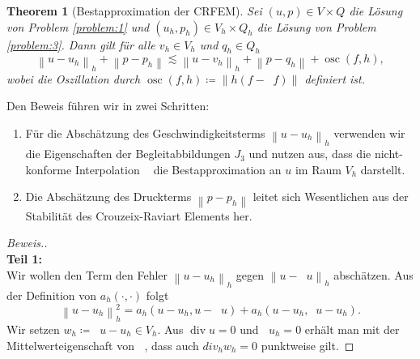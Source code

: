 \message{ !name(script.tex)}\documentclass[a4paper]{scrartcl}
\newcommand{\J}[1]{J_{#1}}
\newcommand{\norm}[1]{\left\lVert#1\right\rVert}
\newcommand{\hnorm}[1]{\left\lVert#1\right\rVert_h}
\DeclareMathOperator{\divOp}{div}
\DeclareMathOperator{\divh}{div_h}
\DeclareMathOperator{\intOp}{I_{NC}}
\DeclareMathOperator{\LtwoOp}{\Pi_0}
\DeclareMathOperator{\osc}{osc}
\theoremstyle{plain}
\newtheorem{theorem}{Theorem}
\theoremstyle{definition}
\theoremstyle{remark}
\begin{document}
\begin{theorem}[Bestapproximation der CRFEM]\label{thm:4}
  Sei \((u,p) \in V\times Q\) die Lösung von Problem \ref{problem:1}
  und \((u_h,p_h) \in V_h\times Q_h\) die Lösung von Problem
  \ref{problem:3}. Dann gilt für alle \(v_h \in V_h\) und \(q_h \in
  Q_h\)
  \begin{equation}
    \label{eq:19}
    \hnorm{u - u_h} + \norm{p - p_h} \lesssim \hnorm{u - v_h} + \norm{p - q_h} + \osc(f,h), 
  \end{equation}
  wobei die Oszillation durch  \(\osc(f, h) \coloneqq \norm{h(f -
    \LtwoOp f)}\) definiert ist. 
\end{theorem}

Den Beweis führen wir in zwei Schritten:
\begin{enumerate}
\item Für die Abschätzung des Geschwindigkeitsterms \(\hnorm{u -
    u_h}\) verwenden wir die Eigenschaften der Begleitabbildungen
  \(\J3\) und nutzen aus, dass die nicht-konforme Interpolation
  \(\intOp\) die Bestapproximation an \(u\) im Raum \(V_h\) darstellt.
\item Die Abschätzung des Druckterms \(\norm{p - p_h}\) leitet sich
  Wesentlichen aus der Stabilität des Crouzeix-Raviart Elements her. 
\end{enumerate}

\begin{proof}[Beweis.]
  \textsf{\textbf{\\Teil 1:}}\\
  Wir wollen den Term den Fehler \(\hnorm{u - u_h}\) gegen \(\hnorm{u
    - \intOp u}\) abschätzen. Aus der Definition von \(a_h(\cdot,
  \cdot)\) folgt
  \begin{equation}
    \label{eq:20}
    \hnorm{u - u_h}^2 = a_h(u - u_h, u - \intOp u) + a_h(u - u_h, \intOp u - u_h). 
  \end{equation}
  Wir setzen \(w_h \coloneqq \intOp u - u_h \in V_h\). Aus \(\divOp u
  = 0\) und \(\divh u_h = 0\) erhält man mit der Mittelwerteigenschaft
  von \(\intOp\), dass auch \(div_h w_h = 0\) punktweise gilt. 
\end{proof}




\end{document}
